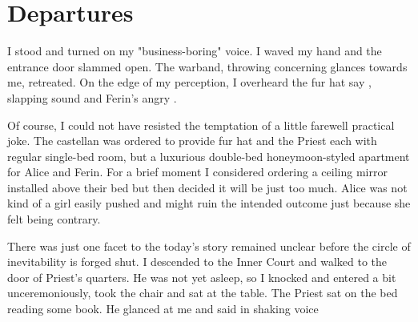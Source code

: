 \section{Departures}

I stood and turned on my "business-boring" voice.  I waved my hand and the entrance door slammed open. The warband, throwing concerning glances towards me, retreated. On the edge of my perception, I overheard the fur hat say , slapping sound and Ferin's angry .

Of course, I could not have resisted the temptation of a little farewell practical joke. The castellan was ordered to provide fur hat and the Priest each with regular single-bed room, but a luxurious double-bed honeymoon-styled apartment for Alice and Ferin. For a brief moment I considered ordering a ceiling mirror installed above their bed but then decided it will be just too much. Alice was not kind of a girl easily pushed and might ruin the intended outcome just because she felt being contrary.

There was just one facet to the today's story remained unclear before the circle of inevitability is forged shut. I descended to the Inner Court and walked to the door of Priest's quarters. He was not yet asleep, so I knocked and entered a bit unceremoniously, took the chair and sat at the table. The Priest sat on the bed reading some book. He glanced at me and said in shaking voice




